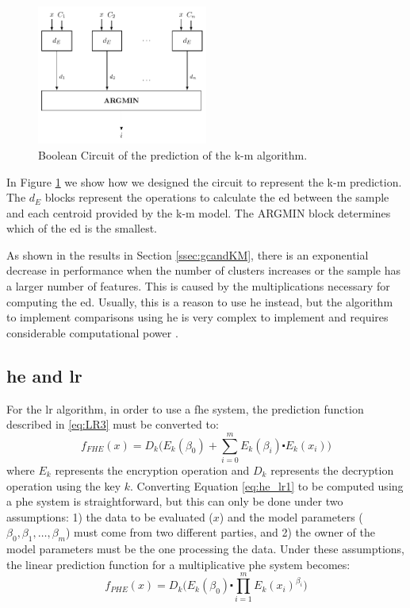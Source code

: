 \begin{figure}[ht]
  \centering
  \includegraphics[width=0.50\textwidth]{images/k-means.pdf}
  \caption{Boolean Circuit of the prediction of the \ac{k-m} algorithm.}
  \label{fig:kmeans}
\end{figure}
In Figure \ref{fig:kmeans} we show how we designed the circuit to represent the \ac{k-m} prediction. The $d_E$ blocks represent the operations to calculate the \ac{ed} between the sample and each centroid provided by the \ac{k-m} model. The ARGMIN block determines which of the \ac{ed} is the smallest.

As shown in the results in Section \ref{ssec:gcandKM}, there is an exponential decrease in performance when the number of clusters increases or the sample has a larger number of features. This is caused by the multiplications necessary for computing the \ac{ed}. Usually, this is a reason to use \ac{he} instead, but the algorithm to implement comparisons using \ac{he} is very complex to implement and requires considerable computational power \cite{blake2004strong}.


\subsection{\acl{he} and \acl{lr}}
\label{ssec:HEandLR}

For the \ac{lr} algorithm, in order to use a \ac{fhe} system, the prediction function described in \ref{eq:LR3} must be converted to:
\begin{equation}
\label{eq:he_lr1}
f_{FHE}(x) = D_k \Bigg( E_k(\beta_0) + \sum_{i=0}^m E_k(\beta_i) \centerdot E_k(x_i) \Bigg)
\end{equation}
where $E_k$ represents the encryption operation and $D_k$ represents the decryption operation using the key $k$.
Converting Equation \ref{eq:he_lr1} to be computed using a \ac{phe} system is straightforward, but this can only be done under two assumptions: 1) the data to be evaluated ($x$) and the model parameters ($\beta_0,\beta_1,\ldots,\beta_m$) must come from two different parties, and 2) the owner of the model parameters must be the one processing the data. Under these assumptions, the linear prediction function for a multiplicative \ac{phe} system becomes:
\begin{equation}
\label{eq:he_lr2}
f_{PHE}(x) = D_k \Bigg(E_k(\beta_0) \centerdot \prod_{i=1}^m E_k(x_i)^{\beta_i}         \Bigg)
\end{equation}


